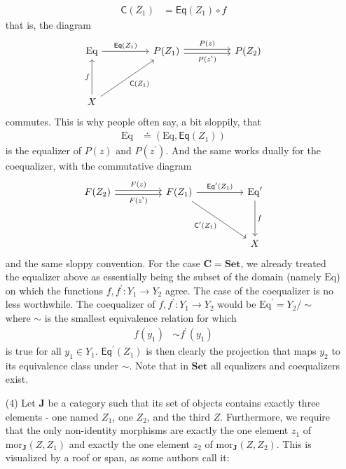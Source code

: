 \begin{exa}
\begin{enumerate}
\begin{align*}
  \mathsf{C}(Z_{1})
  &=
  \mathsf{Eq}(Z_{1})
  \circ
  f
\end{align*}
that is, the diagram
\[
\begin{tikzcd}[sep=huge]
  \mathrm{Eq}
  \arrow{r}{\mathsf{Eq}(Z_{1})}
  &
  P(Z_{1})
  \arrow[shift left=0.5ex]{r}{P(z)}
  \arrow[swap,shift right=0.5ex]{r}{P(z^{\backprime})}
  &
  P(Z_{2})
  \\
  X
  \arrow{u}{f}
  \arrow[swap]{ur}{\mathsf{C}(Z_{1})}
  &
  &
\end{tikzcd}
\]
commutes.
This is why people often say, a bit sloppily, that
\begin{align*}
  \mathrm{Eq}
  &\doteq
  (\mathrm{Eq},\mathsf{Eq}(Z_{1}))
\end{align*}
is the equalizer of $P(z)$ and $P(z^{\backprime})$.
And the same works dually for the coequalizer, with the commutative diagram
\[
\begin{tikzcd}[sep=huge]
  F(Z_{2})
  \arrow[shift left=0.5ex]{r}{F(z)}
  \arrow[swap,shift right=0.5ex]{r}{F(z^{\backprime})}
  &
  F(Z_{1})
  \arrow{r}{\mathsf{Eq}^{\prime}(Z_{1})}
  \arrow[swap]{dr}{\mathsf{C}^{\prime}(Z_{1})}
  &
  \mathrm{Eq}^{\prime}
  \arrow{d}{f}
  \\
  &
  &
  X
\end{tikzcd}
\]
and the same sloppy convention.
For the case $\mathbf{C} = \mathbf{Set}$, we already treated the equalizer above as essentially being the subset of the domain (namely $\mathrm{Eq}$) on which the functions $f,f^{\backprime} \colon Y_{1} \rightarrow Y_{2}$ agree.
The case of the coequalizer is no less worthwhile.
The coequalizer of $f,f^{\backprime} \colon Y_{1} \rightarrow Y_{2}$ would be $\mathrm{Eq}^{\prime} = Y_{2} \slash \sim$ where $\sim$ is the smallest equivalence relation for which
\begin{align*}
  f(y_{1})
  &\sim
  f^{\backprime}(y_{1})
\end{align*}
is true for all $y_{1} \in Y_{1}$.
$\mathsf{Eq}^{\prime}(Z_{1})$ is then clearly the projection that maps $y_{2}$ to its equivalence class under $\sim$.
Note that in $\mathbf{Set}$ all equalizers and coequalizers exist.
\item[(4)]
Let $\mathbf{J}$ be a category such that its set of objects contains exactly three elements - one named $Z_{1}$, one $Z_{2}$, and the third $Z$.
Furthermore, we require that the only non-identity morphisms are exactly the one element $z_{1}$ of $\mathrm{mor}_{\mathbf{J}}(Z,Z_{1})$ and exactly the one element $z_{2}$ of $\mathrm{mor}_{\mathbf{J}}(Z,Z_{2})$.
This is visualized by a roof or span, as some authors call it:

\end{enumerate}
\end{exa}
